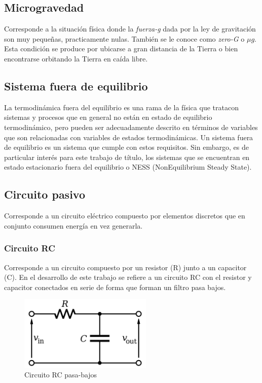 \subsection{Microgravedad}
Corresponde a la situación física donde la \textit{ fuerza-g} dada por la ley de gravitación son muy pequeñas, practicamente nulas. Tambi\'en se le conoce como \textit{zero-G} o $\mu g$.
Esta condición se produce por ubicarse a gran distancia de la Tierra o bien encontrarse orbitando la Tierra en caída libre.
\subsection{Sistema fuera de equilibrio}
La termodinámica fuera del equilibrio es una rama de la física que tratacon sistemas y procesos que en general no están en estado de equilibrio termodinámico, pero pueden ser adecuadamente descrito en t\'erminos de variables que son relacionadas con variables de estados termodinámicas.
Un sistema fuera de equilibrio es un sistema que cumple con estos requisitos. Sin embargo, es de particular inter\'es para este trabajo de título, los sistemas que se encuentran en estado estacionario fuera del equilibrio o NESS (NonEquilibrium Steady State).

\subsection{Circuito pasivo}
Corresponde a un circuito el\'ectrico compuesto por elementos discretos que en conjunto consumen energía en vez generarla.
\subsubsection{Circuito RC}
Corresponde a un circuito compuesto por un resistor (R) junto a un capacitor (C). En el desarrollo de este trabajo se refiere a un circuito RC con el resistor y capacitor conectados en serie de forma que forman un filtro pasa bajos.
\begin{figure}[ht!]
	\centering
	\includegraphics[width=180pt]{images/rc.png}
	\caption{Circuito RC pasa-bajos}
	\label{fig:rc}
\end{figure}

